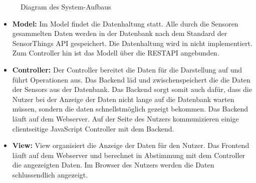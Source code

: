 \begin{figure}
    \caption{Diagram des System-Aufbaus}
\end{figure}
\begin{itemize}
    \item \textbf{Model:} Im Model findet die Datenhaltung statt. Alle durch die Sensoren gesammelten Daten werden in der Datenbank nach dem Standard der \gls{SensorThings API} gespeichert. Die Datenhaltung wird in \softwarename nicht implementiert.
        Zum Controller hin ist das Modell über die \gls{RESTAPI} angebunden.
    \item \textbf{Controller:} Der Controller bereitet die Daten für die Darstellung auf und führt Operationen aus.
        Das \softwarename Backend läd und zwischenspeichert die die Daten der \glspl{Sensor} aus der Datenbank. Das Backend sorgt somit auch dafür, dass die Nutzer bei der Anzeige der Daten nicht lange auf die Datenbank warten müssen, sondern die daten schnellstmöglich gezeigt bekommen.
        Das \softwarename Backend läuft auf dem Webserver. Auf der Seite des Nutzers kommunizieren einige clientseitige \gls{JavaScript} Controller mit dem Backend.
    \item \textbf{View:} View organisiert die Anzeige der Daten für den Nutzer.
        Das \softwarename Frontend läuft auf dem Webserver und berechnet in Abstimmung mit dem Controller die angezeigten Daten.
        Im Browser des Nutzers werden die Daten schlussendlich angezeigt.
\end{itemize}